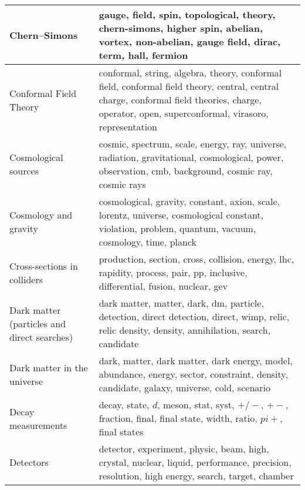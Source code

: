 \begin{longtable}[H]{p{}|p{}}
Chern–Simons                                        &                                                                  gauge, field, spin, topological, theory, chern-simons, higher spin, abelian, vortex, non-abelian, gauge field, dirac, term, hall, fermion \\ \midrule
Conformal Field Theory                              &           conformal, string, algebra, theory, conformal field, conformal field theory, central, central charge, conformal field theories, charge, operator, open, superconformal, virasoro, representation \\ \midrule
Cosmological sources                                &                                                       cosmic, spectrum, scale, energy, ray, universe, radiation, gravitational, cosmological, power, observation, cmb, background, cosmic ray, cosmic rays \\ \midrule
Cosmology and gravity                               &                                                      cosmological, gravity, constant, axion, scale, lorentz, universe, cosmological constant, violation, problem, quantum, vacuum, cosmology, time, planck \\ \midrule
Cross-sections in colliders                         &                                                                             production, section, cross, collision, energy, lhc, rapidity, process, pair, pp, inclusive, differential, fusion, nuclear, gev \\ \midrule
Dark matter (particles and direct searches)         &                                                         dark matter, matter, dark, dm, particle, detection, direct detection, direct, wimp, relic, relic density, density, annihilation, search, candidate \\ \midrule
Dark matter in the universe                         &                                                                 dark, matter, dark matter, dark energy, model, abundance, energy, sector, constraint, density, candidate, galaxy, universe, cold, scenario \\ \midrule
Decay measurements                                  &                                                                                         decay, state, $d$, meson, stat, syst, $+/-$, $+-$, fraction, final, final state, width, ratio, $pi+$, final states \\ \midrule
Detectors                                           &                                                               detector, experiment, physic, beam, high, crystal, nuclear, liquid, performance, precision, resolution, high energy, search, target, chamber \\ \midrule

\end{longtable}
